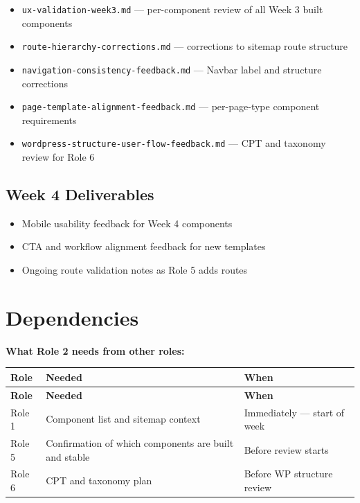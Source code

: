 \documentclass[12pt,a4paper]{article}
\begin{document}
\begin{itemize}
    \item[$\square$] \texttt{ux-validation-week3.md} --- per-component review of all Week 3 built components
    \item[$\square$] \texttt{route-hierarchy-corrections.md} --- corrections to sitemap route structure
    \item[$\square$] \texttt{navigation-consistency-feedback.md} --- Navbar label and structure corrections
    \item[$\square$] \texttt{page-template-alignment-feedback.md} --- per-page-type component requirements
    \item[$\square$] \texttt{wordpress-structure-user-flow-feedback.md} --- CPT and taxonomy review for Role 6
\end{itemize}

\subsection{Week 4 Deliverables}

\begin{itemize}
    \item[$\square$] Mobile usability feedback for Week 4 components
    \item[$\square$] CTA and workflow alignment feedback for new templates
    \item[$\square$] Ongoing route validation notes as Role 5 adds routes
\end{itemize}

\section{Dependencies}

\noindent\textbf{What Role 2 needs from other roles:}

\vspace{0.5em}
\begin{longtable}{@{}p{2cm}p{6.5cm}p{3.8cm}@{}}
\toprule
\rowcolor{uvtLightBlue}
\textbf{Role} & \textbf{Needed} & \textbf{When} \\
\midrule
\endfirsthead
\toprule
\rowcolor{uvtLightBlue}
\textbf{Role} & \textbf{Needed} & \textbf{When} \\
\midrule
\endhead
\bottomrule
\endfoot
Role 1 & Component list and sitemap context & Immediately --- start of week \\
Role 5 & Confirmation of which components are built and stable & Before review starts \\
Role 6 & CPT and taxonomy plan & Before WP structure review \\
\end{longtable}
\end{document}
